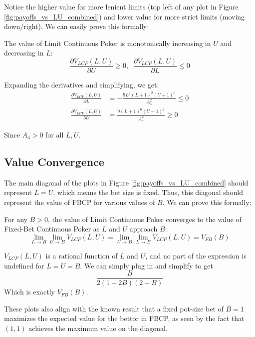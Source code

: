 \documentclass[../../main/main.tex]{subfiles}
\begin{document}
Notice the higher value for more lenient limits (top left of any plot in Figure \ref{fig:payoffs_vs_LU_combined}) and lower value for more strict limits (moving down/right). We can easily prove this formally:

\begin{theorem}
    The value of Limit Continuous Poker is monotonically increasing in $U$ and decreasing in $L$:
\[
    \frac{\partial V_{LCP}(L, U)}{\partial U} \geq 0, \;\; \frac{\partial V_{LCP}(L, U)}{\partial L} \leq 0
\]
\end{theorem}
\begin{customproof}
    Expanding the derivatives and simplifying, we get:
    \begin{align*}
        \frac{\partial V_{LCP}(L, U)}{\partial L} & = -\frac{9 L^2 (L+1)^2 (U+1)^6}{A_4^2} \leq 0 \\
        \frac{\partial V_{LCP}(L, U)}{\partial U} & = \frac{9 (L+1)^6 (U+1)^2}{A_4^2} \geq 0
    \end{align*}

    Since $A_4 > 0$ for all $L, U$.
\end{customproof}

\subsection{Value Convergence}

The main diagonal of the plots in Figure \ref{fig:payoffs_vs_LU_combined} should represent $L=U$, which means the bet size is fixed. Thus, this diagonal should represent the value of FBCP for various values of $B$. We can prove this formally:

\begin{theorem}
    For any $B > 0$, the value of Limit Continuous Poker converges to the value of Fixed-Bet Continuous Poker as $L$ and $U$ approach $B$:
\[
\lim_{L \to B} \lim_{U \to B} V_{LCP}(L, U) = \lim_{U \to B} \lim_{L \to B} V_{LCP}(L, U) = V_{FB}(B)
\]
\end{theorem}

\begin{customproof}
    $V_{LCP}(L, U)$ is a rational function of $L$ and $U$, and no part of the expression is undefined for $L = U = B$. We can simply plug in and simplify to get
    $$ \frac{B}{2(1+2B)(2+B)} $$
    Which is exactly $V_{FB}(B)$.
\end{customproof}

These plots also align with the known result that a fixed pot-size bet of $B=1$ maximizes the expected value for the bettor in FBCP, as seen by the fact that $(1, 1)$ achieves the maximum value on the diagonal. 
\end{document}
